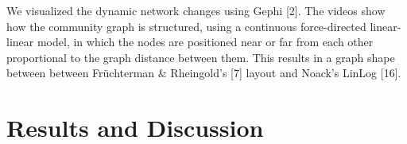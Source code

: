 \documentclass[ifip]{svmult}
\begin{document}
%
We visualized the dynamic network changes using Gephi [2]. The videos show how the community graph is structured, using a continuous force-directed linear-linear model, in which the nodes are positioned near or far from each other proportional to the graph distance between them. This results in a graph shape between between Fr\"{u}chterman \& Rheingold's [7] layout and Noack's LinLog [16].

\section{Results and Discussion}
\label{sec:6}
\end{document}

